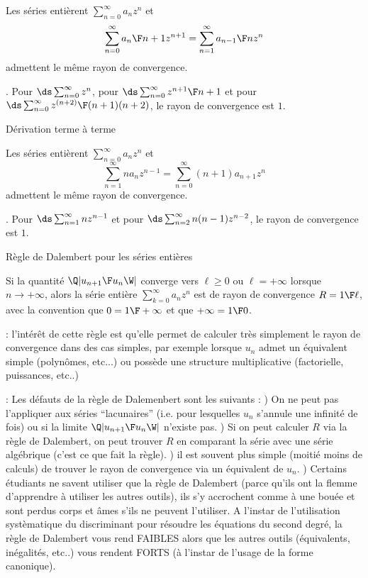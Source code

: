 Les séries entièrent $\sum_{n=0}^\infty a_nz^n$ et 
$$
\sum\limits_{n=0}^\infty {a_n\F n+1}z^{n+1}=\sum_{n=1}^\infty{a_{n-1}\F n}z^n
$$
admettent le même rayon de convergence. 

\Exemple. Pour $\ds\sum_{n=0}^\infty z^n$, pour $\ds\sum_{n=0}^\infty{z^{n+1}\F n+1}$ et pour 
$\ds\sum_{n=0}^\infty{z^{(n+2)}\F (n+1)(n+2)}$, le rayon de convergence est $1$. 

\Concept [Index=Rayon de convergence!Derivation terme a terme@Dérivation terme à terme] Dérivation terme à terme

Les séries entièrent $\sum_{n=0}^\infty a_nz^n$ et 
$$
\sum\limits_{n=1}^\infty na_nz^{n-1}=\sum\limits_{n=0}^\infty(n+1)a_{n+1}z^n
$$ 
admettent le même rayon de convergence. 

\Exemple. Pour $\ds \sum_{n=1}^\infty nz^{n-1}$ et pour $\ds \sum_{n=2}^\infty n(n-1)z^{n-2}$, 
le rayon de convergence est $1$. 


\Concept Règle de Dalembert pour les séries entières

Si la quantité $\Q|{u_{n+1}\F u_n}\W|$ converge vers $\ell\ge0$ ou $\ell=+\infty$ lorsque $n\to+\infty$, 
alors la série entière $\sum_{k=0}^\infty a_nz^n$ est de rayon de convergence $R={1\F \ell}$, avec la convention que $0={1\F+\infty}$ et que $+\infty=1\F 0$. 

\Remarque : l'intérêt de cette règle est qu'elle permet de calculer très simplement le rayon de convergence dans des cas simples, par exemple lorsque $u_n$ admet un équivalent simple (polynômes, etc...) ou possède une structure multiplicative (factorielle, puissances, etc..)

\Remarque : Les défauts de la règle de Dalemenbert sont les suivants : ) On ne peut pas l'appliquer aux séries ``lacunaires'' (i.e. pour lesquelles $u_n$ s'annule une infinité de fois) ou si la limite $\Q|{u_{n+1}\F u_n}\W|$ n'existe pas. ) Si on peut calculer $R$ via la règle de Dalembert, on peut trouver $R$ en comparant la série avec une série algébrique (c'est ce que fait la règle). ) il est souvent plus simple (moitié moins de calculs) de trouver le rayon de convergence via un équivalent de $u_n$. ) Certains étudiants ne savent utiliser que la règle de Dalembert (parce qu'ils ont la flemme d'apprendre à utiliser les autres outils), ils s'y accrochent comme à une bouée et sont perdus corps et âmes s'ils ne peuvent l'utiliser. 
A l'instar de l'utilisation systèmatique du discriminant pour résoudre les équations du second degré, 
la règle de Dalembert vous rend FAIBLES alors que les autres outils (équivalents, inégalités, etc..) vous rendent FORTS (à l'instar de l'usage de la forme canonique). 
\bigskip

